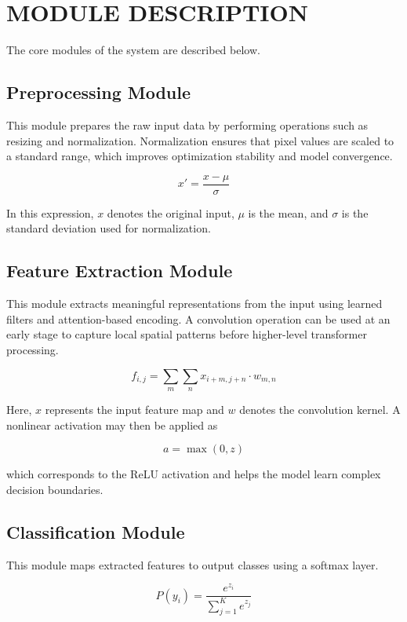 \documentclass[12pt]{report}
\begin{document}
\section{MODULE DESCRIPTION}
The core modules of the system are described below.
\subsection{Preprocessing Module}
This module prepares the raw input data by performing operations such as resizing and normalization. Normalization ensures that pixel values are scaled to a standard range, which improves optimization stability and model convergence.

\begin{equation}
x' = \frac{x - \mu}{\sigma}
\end{equation}

In this expression, $x$ denotes the original input, $\mu$ is the mean, and $\sigma$ is the standard deviation used for normalization.

\subsection{Feature Extraction Module}
This module extracts meaningful representations from the input using learned filters and attention-based encoding. A convolution operation can be used at an early stage to capture local spatial patterns before higher-level transformer processing.

\begin{equation}
f_{i,j} = \sum_m \sum_n x_{i+m, j+n} \cdot w_{m,n}
\end{equation}

Here, $x$ represents the input feature map and $w$ denotes the convolution kernel. A nonlinear activation may then be applied as

\begin{equation}
a = \max(0, z)
\end{equation}

which corresponds to the ReLU activation and helps the model learn complex decision boundaries.

\subsection{Classification Module}
This module maps extracted features to output classes using a softmax layer.

\begin{equation}
P(y_i) = \frac{e^{z_i}}{\sum_{j=1}^{K} e^{z_j}}
\end{equation}
\end{document}
